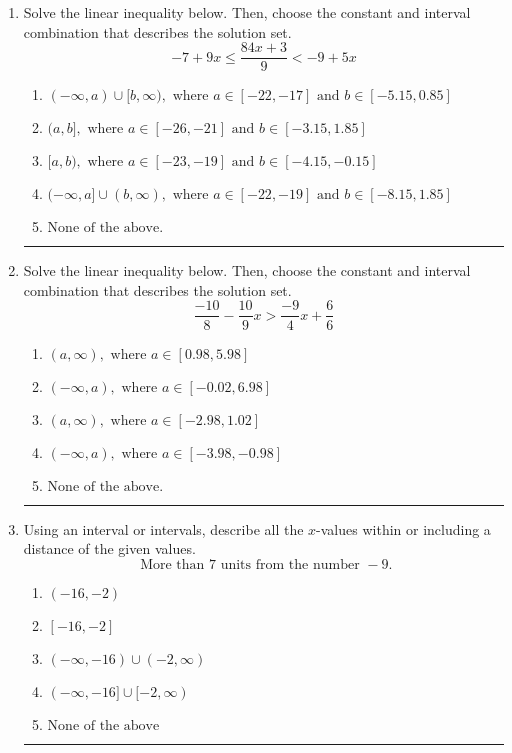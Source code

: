 \documentclass[14pt]{extbook}
\newcommand{\litem}[1]{\item#1\hspace*{-1cm}\rule{\textwidth}{0.4pt}}
\begin{document}
\begin{enumerate}
{\begin{enumerate}[label=\Alph*.]
\end{enumerate} }
\litem{
Solve the linear inequality below. Then, choose the constant and interval combination that describes the solution set.\[ -7 + 9 x \leq \frac{84 x + 3}{9} < -9 + 5 x \]\begin{enumerate}[label=\Alph*.]
\item \( (-\infty, a) \cup [b, \infty), \text{ where } a \in [-22, -17] \text{ and } b \in [-5.15, 0.85] \)
\item \( (a, b], \text{ where } a \in [-26, -21] \text{ and } b \in [-3.15, 1.85] \)
\item \( [a, b), \text{ where } a \in [-23, -19] \text{ and } b \in [-4.15, -0.15] \)
\item \( (-\infty, a] \cup (b, \infty), \text{ where } a \in [-22, -19] \text{ and } b \in [-8.15, 1.85] \)
\item \( \text{None of the above.} \)

\end{enumerate} }
\litem{
Solve the linear inequality below. Then, choose the constant and interval combination that describes the solution set.\[ \frac{-10}{8} - \frac{10}{9} x > \frac{-9}{4} x + \frac{6}{6} \]\begin{enumerate}[label=\Alph*.]
\item \( (a, \infty), \text{ where } a \in [0.98, 5.98] \)
\item \( (-\infty, a), \text{ where } a \in [-0.02, 6.98] \)
\item \( (a, \infty), \text{ where } a \in [-2.98, 1.02] \)
\item \( (-\infty, a), \text{ where } a \in [-3.98, -0.98] \)
\item \( \text{None of the above}. \)

\end{enumerate} }
\litem{
Using an interval or intervals, describe all the $x$-values within or including a distance of the given values.\[ \text{ More than } 7 \text{ units from the number } -9. \]\begin{enumerate}[label=\Alph*.]
\item \( (-16, -2) \)
\item \( [-16, -2] \)
\item \( (-\infty, -16) \cup (-2, \infty) \)
\item \( (-\infty, -16] \cup [-2, \infty) \)
\item \( \text{None of the above} \)

\end{enumerate} }
\end{enumerate}
\end{document}
